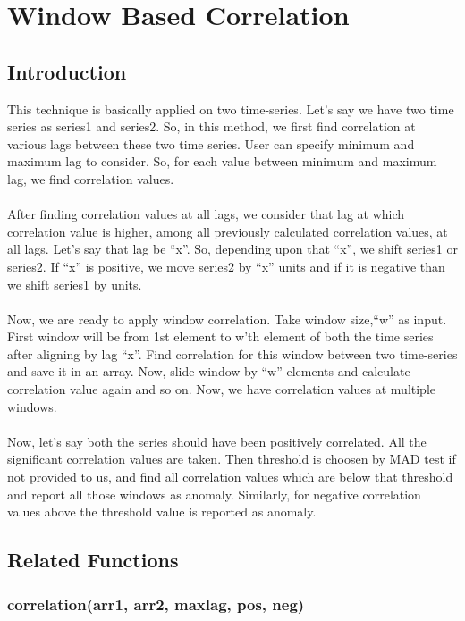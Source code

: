 \chapter{Window Based Correlation}
\label{appendix:correlation}
\section{Introduction}

This technique is basically applied on two time-series. Let's say we have two 
time series as series1 and series2. So, in this method, we first find 
correlation at various lags between these two time series. User can specify 
minimum and maximum lag to consider. So, for each value between minimum and maximum lag, we find correlation values.\\
\\
After finding correlation values at all lags, we consider that lag at which 
correlation value is higher, among all previously calculated correlation values, 
at all lags. Let's say that lag be ``x''. So, depending upon that ``x'', we 
shift series1 or series2. If ``x'' is positive, we move series2 by ``x'' units 
and if it is negative than we shift series1 by  units.\\
\\
Now, we are ready to apply window correlation. Take window size,``w'' as 
input. First window will be from 1st element to w'th element of both the time 
series after aligning by lag ``x''. Find correlation for this window between 
two time-series and save it in an array. Now, slide window by ``w'' elements 
and calculate correlation value again and so on. Now, we have correlation values at 
multiple windows.\\
\\
Now, let's say both the series should have been positively correlated. All the significant correlation values are taken. Then threshold is choosen by MAD test if not provided to us, and find all 
correlation values which are below that threshold and report all those windows 
as anomaly. Similarly, for negative correlation values above the threshold value is reported as anomaly.

\section{Related Functions}

\subsection{correlation(arr1, arr2, maxlag, pos, neg)}

